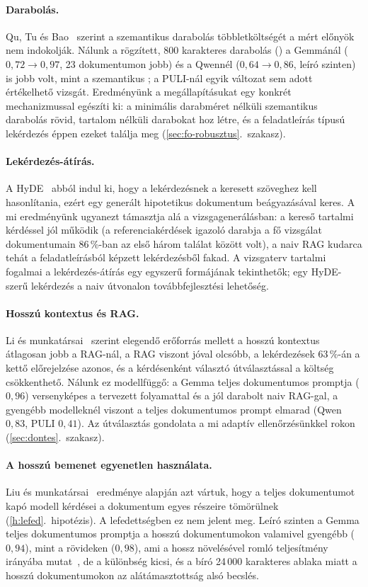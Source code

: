 \paragraph{Darabolás.} Qu, Tu és Bao~\cite{qu2024chunking} szerint a szemantikus darabolás többletköltségét
a mért előnyök nem indokolják. Nálunk a rögzített, 800 karakteres darabolás () a Gemmánál
($0{,}72\to0{,}97$, 23 dokumentumon jobb) és a Qwennél ($0{,}64\to0{,}86$, leíró szinten) is jobb volt, mint a
szemantikus ; a PULI-nál egyik változat sem adott értékelhető vizsgát. Eredményünk a
megállapításukat egy konkrét mechanizmussal egészíti ki: a minimális darabméret nélküli szemantikus
darabolás rövid, tartalom nélküli darabokat hoz létre, és a feladatleírás típusú lekérdezés éppen ezeket
találja meg (\ref{sec:fo-robusztus}.~szakasz).

\paragraph{Lekérdezés-átírás.} A HyDE~\cite{gao2023hyde} abból indul ki, hogy a lekérdezésnek a keresett
szöveghez kell hasonlítania, ezért egy generált hipotetikus dokumentum beágyazásával keres. A mi
eredményünk ugyanezt támasztja alá a vizsgagenerálásban: a kereső tartalmi kérdéssel jól működik (a
referenciakérdések igazoló darabja a fő vizsgálat dokumentumain 86\,\%-ban az első három találat között volt), a naiv
RAG kudarca tehát a feladatleírásból képzett lekérdezésből fakad. A vizsgaterv tartalmi fogalmai a
lekérdezés-átírás egy egyszerű formájának tekinthetők; egy HyDE-szerű lekérdezés a naiv útvonalon
továbbfejlesztési lehetőség.

\paragraph{Hosszú kontextus és RAG.} Li és munkatársai~\cite{li2024ragvslc} szerint elegendő erőforrás
mellett a hosszú kontextus átlagosan jobb a RAG-nál, a RAG viszont jóval olcsóbb, a lekérdezések 63\,\%-án a
kettő előrejelzése azonos, és a kérdésenként választó útválasztással a költség csökkenthető. Nálunk ez modellfüggő: a Gemma teljes
dokumentumos promptja ($0{,}96$) versenyképes a tervezett folyamattal és a jól darabolt naiv RAG-gal, a
gyengébb modelleknél viszont a teljes dokumentumos prompt elmarad (Qwen $0{,}83$, PULI $0{,}41$). Az
útválasztás gondolata a mi adaptív ellenőrzésünkkel rokon (\ref{sec:dontes}.~szakasz).

\paragraph{A hosszú bemenet egyenetlen használata.} Liu és munkatársai~\cite{liu2024lost} eredménye alapján
azt vártuk, hogy a teljes dokumentumot kapó modell kérdései a dokumentum egyes részeire tömörülnek
(\ref{h:lefed}.~hipotézis). A lefedettségben ez nem jelent meg. Leíró szinten a Gemma teljes dokumentumos
promptja a hosszú dokumentumokon valamivel gyengébb ($0{,}94$), mint a rövideken ($0{,}98$), ami a hossz
növelésével romló teljesítmény irányába mutat~\cite{hsieh2024ruler}, de a különbség kicsi, és a bíró 24\,000
karakteres ablaka miatt a hosszú dokumentumokon az alátámasztottság alsó becslés.


